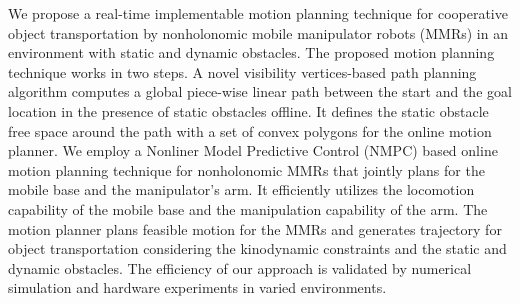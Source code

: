 We propose a real-time implementable motion planning technique for cooperative object transportation by nonholonomic mobile manipulator robots (MMRs) in an environment with static and dynamic obstacles. The proposed motion planning technique works in two steps. A novel visibility vertices-based path planning algorithm computes a global piece-wise linear path between the start and the goal location in the presence of static obstacles offline. It defines the static obstacle free space around the path with a set of convex polygons for the online motion planner. We employ a Nonliner Model Predictive Control (NMPC) based online motion planning technique for nonholonomic MMRs that jointly plans for the mobile base and the manipulator's arm. It efficiently utilizes the locomotion capability of the mobile base and the manipulation capability of the arm. The motion planner plans feasible motion for the MMRs and generates trajectory for object transportation considering the kinodynamic constraints and the static and dynamic obstacles. The efficiency of our approach is validated by numerical simulation and hardware experiments in varied environments.